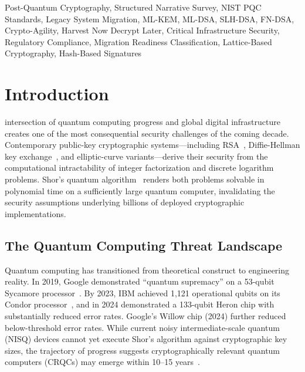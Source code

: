 \documentclass[journal]{IEEEtran}
\begin{document}
\begin{abstract}
This survey provides researchers, practitioners, and policymakers with a
structured roadmap for evidence-based PQC migration decision-making, supported
by reproducible analysis code and a curated dataset.
\end{abstract}

\begin{IEEEkeywords}
Post-Quantum Cryptography, Structured Narrative Survey, NIST PQC Standards,
Legacy System Migration, ML-KEM, ML-DSA, SLH-DSA, FN-DSA, Crypto-Agility,
Harvest Now Decrypt Later, Critical Infrastructure Security, Regulatory Compliance,
Migration Readiness Classification, Lattice-Based Cryptography, Hash-Based Signatures
\end{IEEEkeywords}

\section{Introduction}
\label{sec:intro}

 intersection of quantum computing progress and global digital
infrastructure creates one of the most consequential security challenges of the
coming decade. Contemporary public-key cryptographic systems---including RSA~\cite{rivest1978method},
Diffie-Hellman key exchange~\cite{diffie1976new}, and elliptic-curve variants---derive
their security from the computational intractability of integer factorization and
discrete logarithm problems. Shor's quantum algorithm~\cite{shor1994algorithms}
renders both problems solvable in polynomial time on a sufficiently large
quantum computer, invalidating the security assumptions underlying billions of
deployed cryptographic implementations.

\subsection{The Quantum Computing Threat Landscape}

Quantum computing has transitioned from theoretical construct to engineering
reality. In 2019, Google demonstrated ``quantum supremacy'' on a 53-qubit
Sycamore processor~\cite{arute2019quantum}. By 2023, IBM achieved 1,121
operational qubits on its Condor processor~\cite{ibm2023condor}, and in 2024
demonstrated a 133-qubit Heron chip with substantially reduced error rates.
Google's Willow chip (2024) further reduced below-threshold error rates.
While current noisy intermediate-scale quantum (NISQ) devices cannot yet
execute Shor's algorithm against cryptographic key sizes, the trajectory of
progress suggests cryptographically relevant quantum computers (CRQCs) may
emerge within 10--15 years~\cite{mosca2018cybersecurity,preskill2018quantum}.
\end{document}
